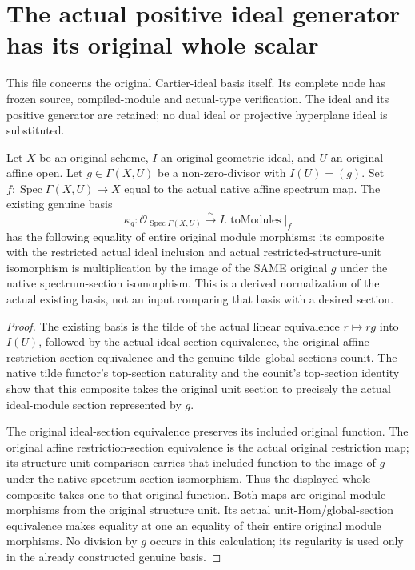 \section{The actual positive ideal generator has its original whole scalar}

This file concerns the original Cartier-ideal basis itself.  Its complete
node has frozen source, compiled-module and actual-type verification.
The ideal and its positive generator
are retained; no dual ideal or projective hyperplane ideal is substituted.

\begin{lemma}
\label{lem:resume-original-regular-generator-whole-scalar}
\leanok
Let $X$ be an original scheme, $I$ an original geometric ideal, and $U$
an original affine open.  Let $g\in\Gamma(X,U)$ be a non-zero-divisor
with $I(U)=(g)$.  Set $f:\operatorname{Spec}\Gamma(X,U)\to X$ equal
to the actual native affine spectrum map.  The existing genuine basis
\[
 \kappa_g:\mathcal O_{\operatorname{Spec}\Gamma(X,U)}
       \xrightarrow{\sim} I.\operatorname{toModules}|_f
\]
has the following equality of entire original module morphisms:
its composite with the restricted actual ideal inclusion and actual
restricted-structure-unit isomorphism is multiplication by the image
of the SAME original $g$ under the native spectrum-section isomorphism.
This is a derived normalization of the actual existing basis, not an
input comparing that basis with a desired section.
\end{lemma}
\begin{proof}
The existing basis is the tilde of the actual linear equivalence
$r\mapsto rg$ into $I(U)$, followed by the actual ideal-section
equivalence, the original affine restriction-section equivalence and
the genuine tilde--global-sections counit.  The native tilde functor's
top-section naturality and the counit's top-section identity show that
this composite takes the original unit section to precisely the actual
ideal-module section represented by $g$.

The original ideal-section equivalence preserves its included original
function.  The original affine restriction-section equivalence is the
actual original restriction map; its structure-unit comparison carries
that included function to the image of $g$ under the native
spectrum-section isomorphism.  Thus the displayed whole composite takes
one to that original function.  Both maps are original module morphisms
from the original structure unit.  Its actual unit-Hom/global-section
equivalence makes equality at one an equality of their entire original
module morphisms.  No division by $g$ occurs in this calculation; its
regularity is used only in the already constructed genuine basis.
\end{proof}
